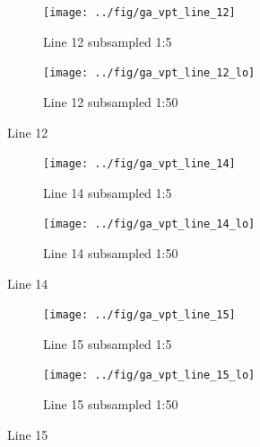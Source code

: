 \begin{figure}
	\centering
	\begin{subfigure}[b]{1\textwidth}
		\centering
		\texttt{[image: ../fig/ga\_vpt\_line\_12]}
		\caption[Line 12]{Line 12 subsampled 1:5 }
		\label{fig:galine12}
	\end{subfigure}
	
	\begin{subfigure}[b]{1\textwidth}
		\centering
		\texttt{[image: ../fig/ga\_vpt\_line\_12\_lo]}
		\caption[Line 12]{Line 12 subsampled 1:50 }
		\label{fig:galine12_lo}
	\end{subfigure}
	
	\caption[Line 12]{Line 12}
\end{figure}

\begin{figure}
	\centering
	\begin{subfigure}[b]{1\textwidth}
		\centering
		\texttt{[image: ../fig/ga\_vpt\_line\_14]}
		\caption[Line 14]{Line 14 subsampled 1:5 }
		\label{fig:galine14}
	\end{subfigure}
	
	\begin{subfigure}[b]{1\textwidth}
		\centering
		\texttt{[image: ../fig/ga\_vpt\_line\_14\_lo]}
		\caption[Line 14]{Line 14 subsampled 1:50 }
		\label{fig:galine14_lo}
	\end{subfigure}
	
	\caption[Line 14]{Line 14}
\end{figure}

\begin{figure}
	\centering
	\begin{subfigure}[b]{1\textwidth}
		\centering
		\texttt{[image: ../fig/ga\_vpt\_line\_15]}
		\caption[Line 15]{Line 15 subsampled 1:5 }
		\label{fig:galine15}
	\end{subfigure}
	
	\begin{subfigure}[b]{1\textwidth}
		\centering
		\texttt{[image: ../fig/ga\_vpt\_line\_15\_lo]}
		\caption[Line 15]{Line 15 subsampled 1:50 }
		\label{fig:galine15_lo}
	\end{subfigure}
	
	\caption[Line 15]{Line 15}
\end{figure}

